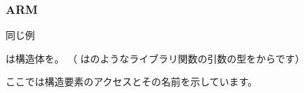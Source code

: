 ﻿\subsubsection{ARM}

\myparagraph{\OptimizingKeilVI (\ThumbMode)}

同じ例



\myparagraph{\OptimizingXcodeIV (\ThumbTwoMode)}

\IDA は構造体を。
（ \IDA はのようなライブラリ関数の引数の型をからです）

ここでは構造要素のアクセスとその名前を示しています。


